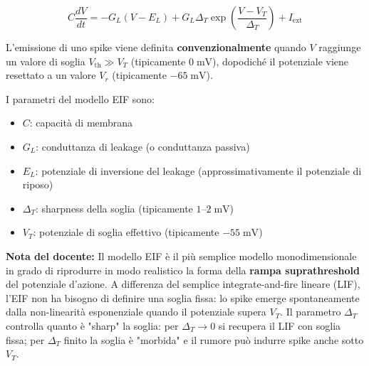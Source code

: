 \begin{equation}
C \frac{dV}{dt} = -G_L(V - E_L) + G_L \Delta_T \exp\!\left(\frac{V - V_T}{\Delta_T}\right) + I_{\text{ext}}
\end{equation}

L'emissione di uno spike viene definita \textbf{convenzionalmente} quando $V$ raggiunge un valore di soglia $V_{\text{th}} \gg V_T$ (tipicamente $0 \; \text{mV}$), dopodiché il potenziale viene resettato a un valore $V_r$ (tipicamente $-65 \; \text{mV}$).

I parametri del modello EIF sono:
\begin{itemize}
    \item $C$: capacità di membrana
    \item $G_L$: conduttanza di leakage (o conduttanza passiva)
    \item $E_L$: potenziale di inversione del leakage (approssimativamente il potenziale di riposo)
    \item $\Delta_T$: sharpness della soglia (tipicamente $1$–$2 \; \text{mV}$)
    \item $V_T$: potenziale di soglia effettivo (tipicamente $-55 \; \text{mV}$)
\end{itemize}

\begin{tcolorbox}[colback=gray!5, colframe=gray!40, arc=2mm, boxrule=0.5pt]
\textbf{Nota del docente:} Il modello EIF è il più semplice modello monodimensionale in grado di riprodurre in modo realistico la forma della \textbf{rampa suprathreshold} del potenziale d'azione. A differenza del semplice integrate-and-fire lineare (LIF), l'EIF non ha bisogno di definire una soglia fissa: lo spike emerge spontaneamente dalla non-linearità esponenziale quando il potenziale supera $V_T$. Il parametro $\Delta_T$ controlla quanto è "sharp" la soglia: per $\Delta_T \to 0$ si recupera il LIF con soglia fissa; per $\Delta_T$ finito la soglia è "morbida" e il rumore può indurre spike anche sotto $V_T$.
\end{tcolorbox}


